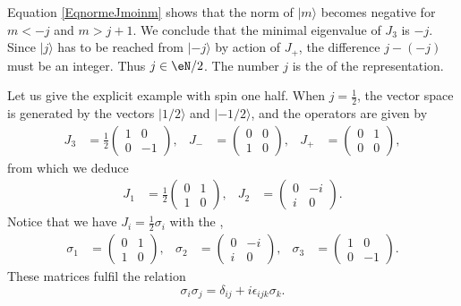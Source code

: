 Equation \eqref{EqnormeJmoinm} shows that the norm of $| m \rangle$ becomes negative for $m<-j$ and $m>j+1$. We conclude that the minimal eigenvalue of $J_3$ is $-j$. Since $| j \rangle$ has to be reached from $| -j \rangle$ by action of $J_+$, the difference $j-(-j)$ must be an integer. Thus $j\in\eN/2$. The number $j$ is the  of the representation.

Let us give the explicit example with spin one half.
When $j=\frac{ 1 }{2}$, the vector space is generated by the vectors $| 1/2 \rangle$ and $| -1/2 \rangle$, and the operators are given by
\begin{align}
	J_3&=\frac{ 1 }{2}
\begin{pmatrix}
  1	&	0	\\ 
  0	&	-1	
\end{pmatrix},
&J_-&=
\begin{pmatrix}
  0	&	0	\\ 
  1	&	0	
\end{pmatrix},
&J_+&=
\begin{pmatrix}
  0	&	1	\\ 
  0	&	0	
\end{pmatrix},
\end{align}
from which we deduce
\begin{align*}
J_1&=\frac{ 1 }{2}
\begin{pmatrix}
  0	&	1	\\ 
  1	&	0	
\end{pmatrix},
&J_2&=
\begin{pmatrix}
  0	&	-i	\\ 
  i	&	0	
\end{pmatrix}.
\end{align*}
Notice that we have $J_i=\frac{ 1 }{2}\sigma_i$ with the ,
\begin{align}
\sigma_1&=
\begin{pmatrix}
  0	&	1	\\ 
  1	&	0	
\end{pmatrix},
&\sigma_2&=
\begin{pmatrix}
  0	&	-i	\\ 
  i	&	0	
\end{pmatrix},
&\sigma_3&=
\begin{pmatrix}
  1	&	0	\\ 
  0	&	-1	
\end{pmatrix}.
\end{align}
These matrices fulfil the relation 
\begin{equation}
	\sigma_i\sigma_j=\delta_{ij}+i\epsilon_{ijk}\sigma_k.
\end{equation}

